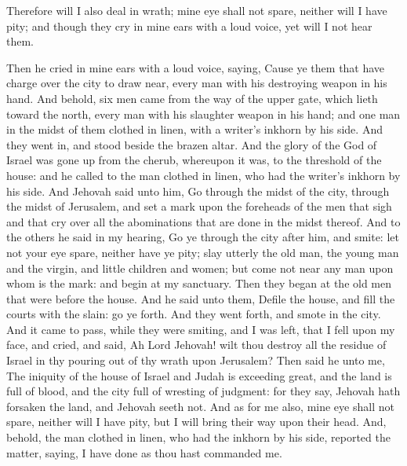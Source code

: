 Therefore will I also deal in wrath; mine eye shall not spare, neither will I have pity; and though they cry in mine ears with a loud voice, yet will I not hear them. 

Then he cried in mine ears with a loud voice, saying, Cause ye them that have charge over the city to draw near, every man with his destroying weapon in his hand. And behold, six men came from the way of the upper gate, which lieth toward the north, every man with his slaughter weapon in his hand; and one man in the midst of them clothed in linen, with a writer’s inkhorn by his side. And they went in, and stood beside the brazen altar.  And the glory of the God of Israel was gone up from the cherub, whereupon it was, to the threshold of the house: and he called to the man clothed in linen, who had the writer’s inkhorn by his side. And Jehovah said unto him, Go through the midst of the city, through the midst of Jerusalem, and set a mark upon the foreheads of the men that sigh and that cry over all the abominations that are done in the midst thereof. And to the others he said in my hearing, Go ye through the city after him, and smite: let not your eye spare, neither have ye pity; slay utterly the old man, the young man and the virgin, and little children and women; but come not near any man upon whom is the mark: and begin at my sanctuary. Then they began at the old men that were before the house. And he said unto them, Defile the house, and fill the courts with the slain: go ye forth. And they went forth, and smote in the city. And it came to pass, while they were smiting, and I was left, that I fell upon my face, and cried, and said, Ah Lord Jehovah! wilt thou destroy all the residue of Israel in thy pouring out of thy wrath upon Jerusalem?  Then said he unto me, The iniquity of the house of Israel and Judah is exceeding great, and the land is full of blood, and the city full of wresting of judgment: for they say, Jehovah hath forsaken the land, and Jehovah seeth not. And as for me also, mine eye shall not spare, neither will I have pity, but I will bring their way upon their head. And, behold, the man clothed in linen, who had the inkhorn by his side, reported the matter, saying, I have done as thou hast commanded me. 

